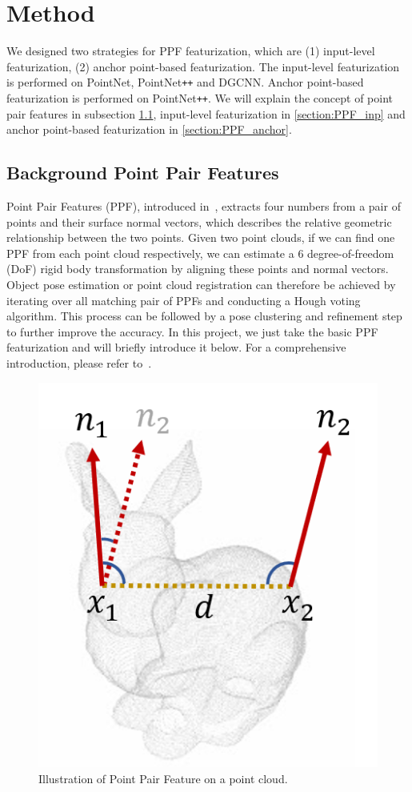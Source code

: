 \documentclass{article}
\begin{document}
\section{Method}

We designed two strategies for PPF featurization, which are (1) input-level featurization, (2) anchor point-based featurization. The input-level featurization is performed on PointNet, PointNet\texttt{++} and DGCNN. Anchor point-based featurization is performed on PointNet\texttt{++}. We will explain the concept of point pair features in subsection \ref{section:PPF}, input-level featurization in \ref{section:PPF_inp} and anchor point-based featurization in \ref{section:PPF_anchor}.

\subsection{Background Point Pair Features}
\label{section:PPF}

Point Pair Features (PPF), introduced in~\cite{Drost2010-ppf}, extracts four numbers from a pair of points and their surface normal vectors, which describes the relative geometric relationship between the two points. Given two point clouds, if we can find one PPF from each point cloud respectively, we can estimate a 6 degree-of-freedom (DoF) rigid body transformation by aligning these points and normal vectors. Object pose estimation or point cloud registration can therefore be achieved by iterating over all matching pair of PPFs and conducting a Hough voting algorithm. This process can be followed by a pose clustering and refinement step to further improve the accuracy. In this project, we just take the basic PPF featurization and will briefly introduce it below. For a comprehensive introduction, please refer to~\cite{Drost2010-ppf, Vidal2018-rh}. 

\begin{figure}[t]
    \centering
    \includegraphics[width=0.25\linewidth]{images/ppf.png}
    \caption{Illustration of Point Pair Feature on a point cloud. }
    \label{fig:ppf_illu}
\end{figure}
\end{document}
